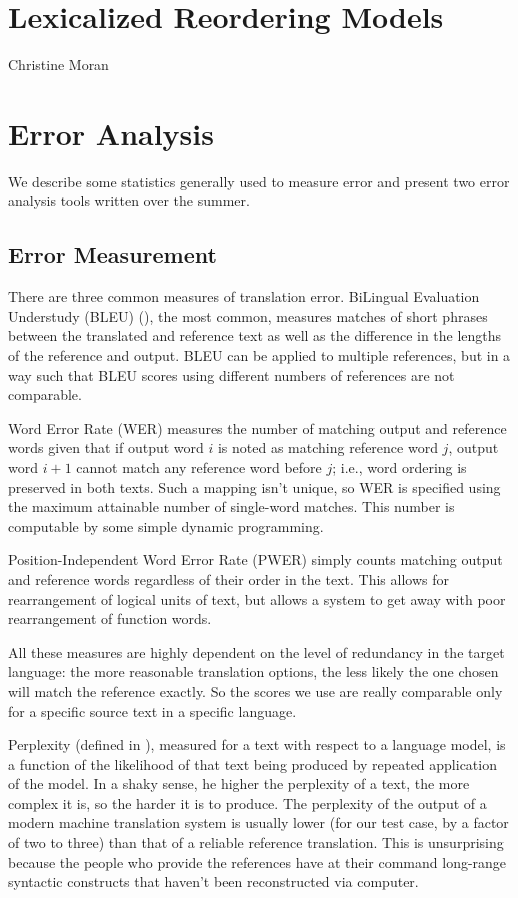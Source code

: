 \documentclass[10pt]{report}
\theoremstyle{plain}
\begin{document}
{\section{Lexicalized Reordering Models}
{\sc Christine Moran}

\section{Error Analysis}
We describe some statistics generally used to measure error and present two error analysis tools written over the summer.

\subsection{Error Measurement}
There are three common measures of translation error. BiLingual Evaluation Understudy (BLEU) (\cite{bleu}), the most common, measures matches of short phrases between the translated and reference text as well as the difference in the lengths of the reference and output. BLEU can be applied to multiple references, but in a way such that BLEU scores using different numbers of references are not comparable.

Word Error Rate (WER) measures the number of matching output and reference words given that if output word $i$ is noted as matching reference word $j$, output word $i + 1$ cannot match any reference word before $j$; i.e., word ordering is preserved in both texts. Such a mapping isn't unique, so WER is specified using the maximum attainable number of single-word matches. This number is computable by some simple dynamic programming.

Position-Independent Word Error Rate (PWER) simply counts matching output and reference words regardless of their order in the text. This allows for rearrangement of logical units of text, but allows a system to get away with poor rearrangement of function words.

All these measures are highly dependent on the level of redundancy in the target language: the more reasonable translation options, the less likely the one chosen will match the reference exactly. So the scores we use are really comparable only for a specific source text in a specific language.

Perplexity (defined in \cite{perplexity}), measured for a text with respect to a language model, is a function of the likelihood of that text being produced by repeated application of the model. In a shaky sense, he higher the perplexity of a text, the more complex it is, so the harder it is to produce. The perplexity of the output of a modern machine translation system is usually lower (for our test case, by a factor of two to three) than that of a reliable reference translation. This is unsurprising because the people who provide the references have at their command long-range syntactic constructs that haven't been reconstructed via computer.

}
\end{document}
